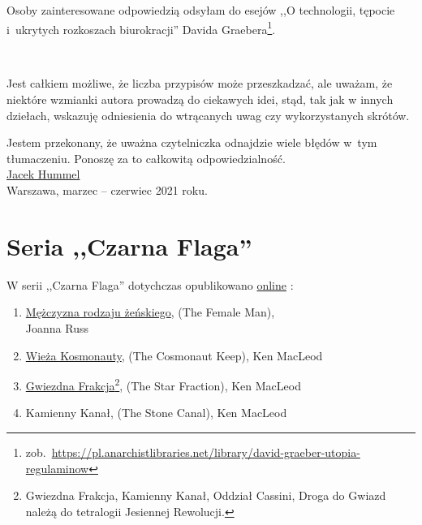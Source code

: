 \documentclass[oneside,polish,11pt,sfheadings]{mwbk}
\begin{document}
Osoby zainteresowane odpowiedzią odsyłam do esejów ,,O technologii, tępocie i~ukrytych rozkoszach biurokracji'' Davida Graebera\footnote{zob.~\url{https://pl.anarchistlibraries.net/library/david-graeber-utopia-regulaminow}}.

~

Jest całkiem możliwe, że liczba przypisów może przeszkadzać, ale uważam, że niektóre wzmianki autora prowadzą do ciekawych idei, stąd, tak jak w innych dziełach, wskazuję odniesienia do wtrącanych uwag czy wykorzystanych skrótów.

Jestem przekonany, że uważna czytelniczka odnajdzie wiele błędów w~tym tłumaczeniu. Ponoszę za to całkowitą odpowiedzialność. \\

\href{mailto:theskymyladythesky@zoho.eu}{Jacek Hummel}\\

Warszawa, marzec -- czerwiec 2021 roku.

\chapter*{Seria ,,Czarna Flaga''}

\begin{center}
\begin{large}
W serii ,,Czarna Flaga'' dotychczas opublikowano 
\href{https://archive.org/details/@j_hummel?and[]=year\%3A\%222021\%22}{online}
:
\end{large} 
\end{center}


\begin{enumerate}
\item \href{https://archive.org/details/joanna-russ-mezczyzna-rodzaju-zenskiego/Joanna_Russ_M\%C4\%99\%C5\%BCczyzna_rodzaju_\%C5\%BCe\%C5\%84skiego}{Mężczyzna rodzaju żeńskiego}, (The Female Man),\\ Joanna Russ
\item \href{https://archive.org/details/ken-macleod-wieza-kosmonauty}{Wieża Kosmonauty}, (The Cosmonaut Keep), Ken MacLeod
\item \href{https://archive.org/details/ken-mac-leod-jesienna-rewolucja-gwiezdna-frakcja}{Gwiezdna Frakcja}\footnote{Gwiezdna Frakcja, Kamienny Kanał, Oddział Cassini, Droga do Gwiazd należą do tetralogii Jesiennej Rewolucji.}, (The Star Fraction),	 Ken MacLeod
\item Kamienny Kanał, (The Stone Canal), Ken MacLeod
\end{enumerate}
\end{document}

